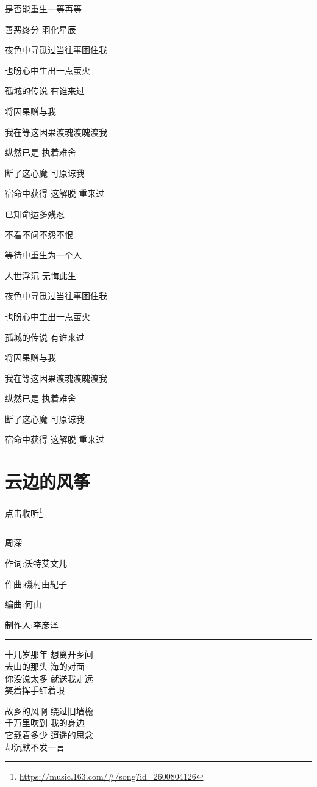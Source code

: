 \documentclass[]{ctexbook}
\renewcommand{\href}[2]{#2\footnote{\url{#1}}}
\begin{document}
是否能重生一等再等

善恶终分 羽化星辰

夜色中寻觅过当往事困住我

也盼心中生出一点萤火

孤城的传说 有谁来过

将因果赠与我

我在等这因果渡魂渡魄渡我

纵然已是 执着难舍

断了这心魔 可原谅我

宿命中获得 这解脱 重来过

已知命运多残忍

不看不问不怨不恨

等待中重生为一个人

人世浮沉 无悔此生

夜色中寻觅过当往事困住我

也盼心中生出一点萤火

孤城的传说 有谁来过

将因果赠与我

我在等这因果渡魂渡魄渡我

纵然已是 执着难舍

断了这心魔 可原谅我

宿命中获得 这解脱 重来过

\section*{云边的风筝}\label{the-kite-by-the-cloud}


\href{https://music.163.com/\#/song?id=2600804126}{点击收听}

\begin{center}\rule{0.5\linewidth}{0.5pt}\end{center}

周深

作词:沃特艾文儿

作曲:磯村由紀子

编曲:何山

制作人:李彦泽

\begin{center}\rule{0.5\linewidth}{0.5pt}\end{center}

十几岁那年 想离开乡间\\
去山的那头 海的对面\\
你没说太多 就送我走远\\
笑着挥手红着眼

故乡的风啊 绕过旧墙檐\\
千万里吹到 我的身边\\
它载着多少 迢遥的思念\\
却沉默不发一言
\end{document}
